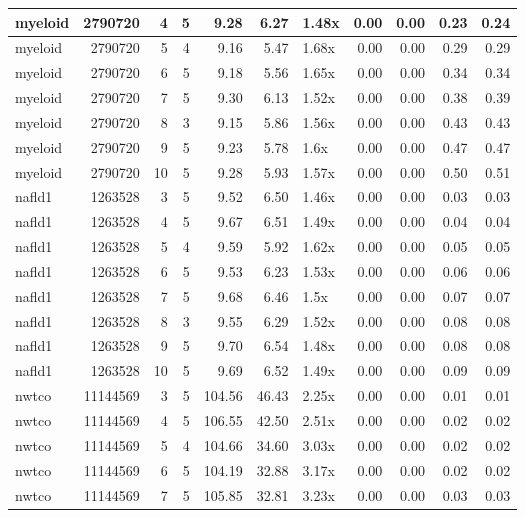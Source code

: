\begin{table}[ht]
\begin{tabular}{lrrrrrlrrrr}
   \hline
myeloid & 2790720 &   4 &   5 & 9.28 & 6.27 & 1.48x & 0.00 & 0.00 & 0.23 & 0.24 \\ 
   \hline
myeloid & 2790720 &   5 &   4 & 9.16 & 5.47 & 1.68x & 0.00 & 0.00 & 0.29 & 0.29 \\ 
   \hline
myeloid & 2790720 &   6 &   5 & 9.18 & 5.56 & 1.65x & 0.00 & 0.00 & 0.34 & 0.34 \\ 
   \hline
myeloid & 2790720 &   7 &   5 & 9.30 & 6.13 & 1.52x & 0.00 & 0.00 & 0.38 & 0.39 \\ 
   \hline
myeloid & 2790720 &   8 &   3 & 9.15 & 5.86 & 1.56x & 0.00 & 0.00 & 0.43 & 0.43 \\ 
   \hline
myeloid & 2790720 &   9 &   5 & 9.23 & 5.78 & 1.6x & 0.00 & 0.00 & 0.47 & 0.47 \\ 
   \hline
myeloid & 2790720 &  10 &   5 & 9.28 & 5.93 & 1.57x & 0.00 & 0.00 & 0.50 & 0.51 \\ 
   \hline
nafld1 & 1263528 &   3 &   5 & 9.52 & 6.50 & 1.46x & 0.00 & 0.00 & 0.03 & 0.03 \\ 
   \hline
nafld1 & 1263528 &   4 &   5 & 9.67 & 6.51 & 1.49x & 0.00 & 0.00 & 0.04 & 0.04 \\ 
   \hline
nafld1 & 1263528 &   5 &   4 & 9.59 & 5.92 & 1.62x & 0.00 & 0.00 & 0.05 & 0.05 \\ 
   \hline
nafld1 & 1263528 &   6 &   5 & 9.53 & 6.23 & 1.53x & 0.00 & 0.00 & 0.06 & 0.06 \\ 
   \hline
nafld1 & 1263528 &   7 &   5 & 9.68 & 6.46 & 1.5x & 0.00 & 0.00 & 0.07 & 0.07 \\ 
   \hline
nafld1 & 1263528 &   8 &   3 & 9.55 & 6.29 & 1.52x & 0.00 & 0.00 & 0.08 & 0.08 \\ 
   \hline
nafld1 & 1263528 &   9 &   5 & 9.70 & 6.54 & 1.48x & 0.00 & 0.00 & 0.08 & 0.08 \\ 
   \hline
nafld1 & 1263528 &  10 &   5 & 9.69 & 6.52 & 1.49x & 0.00 & 0.00 & 0.09 & 0.09 \\ 
   \hline
nwtco & 11144569 &   3 &   5 & 104.56 & 46.43 & 2.25x & 0.00 & 0.00 & 0.01 & 0.01 \\ 
   \hline
nwtco & 11144569 &   4 &   5 & 106.55 & 42.50 & 2.51x & 0.00 & 0.00 & 0.02 & 0.02 \\ 
   \hline
nwtco & 11144569 &   5 &   4 & 104.66 & 34.60 & 3.03x & 0.00 & 0.00 & 0.02 & 0.02 \\ 
   \hline
nwtco & 11144569 &   6 &   5 & 104.19 & 32.88 & 3.17x & 0.00 & 0.00 & 0.02 & 0.02 \\ 
   \hline
nwtco & 11144569 &   7 &   5 & 105.85 & 32.81 & 3.23x & 0.00 & 0.00 & 0.03 & 0.03 \\ 

\end{tabular}
\end{table}
